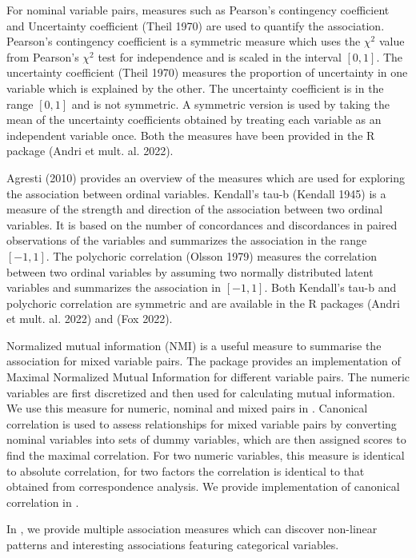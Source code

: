 For nominal variable pairs, measures such as Pearson's contingency coefficient and Uncertainty coefficient (Theil 1970) are used to quantify the association. Pearson's contingency coefficient is a symmetric measure which uses the \({\chi}^2\) value from Pearson's \({\chi}^2\) test for independence and is scaled in the interval \([0,1]\). The uncertainty coefficient (Theil 1970) measures the proportion of uncertainty in one variable which is explained by the other. The uncertainty coefficient is in the range \([0,1]\) and is not symmetric. A symmetric version is used by taking the mean of the uncertainty coefficients obtained by treating each variable as an independent variable once. Both the measures have been provided in the R package  (Andri et mult. al. 2022).

Agresti (2010) provides an overview of the measures which are used for exploring the association between ordinal variables. Kendall's tau-b (Kendall 1945) is a measure of the strength and direction of the association between two ordinal variables. It is based on the number of concordances and discordances in paired observations of the variables and summarizes the association in the range \([-1,1]\). The polychoric correlation (Olsson 1979) measures the correlation between two ordinal variables by assuming two normally distributed latent variables and summarizes the association in \([-1,1]\). Both Kendall's tau-b and polychoric correlation are symmetric and are available in the R packages  (Andri et mult. al. 2022) and  (Fox 2022).

Normalized mutual information (NMI) is a useful measure to summarise the association for mixed variable pairs. The package  provides an implementation of Maximal Normalized Mutual Information for different variable pairs. The numeric variables are first discretized and then used for calculating mutual information. We use this measure for numeric, nominal and mixed pairs in . Canonical correlation is used to assess relationships for mixed variable pairs by converting nominal variables into sets of dummy variables, which are then assigned scores to find the maximal correlation. For two numeric variables, this measure is identical to absolute correlation, for two factors the correlation is identical to that obtained from correspondence analysis. We provide implementation of canonical correlation in .

In , we provide multiple association measures which can discover non-linear patterns and interesting associations featuring categorical variables.

